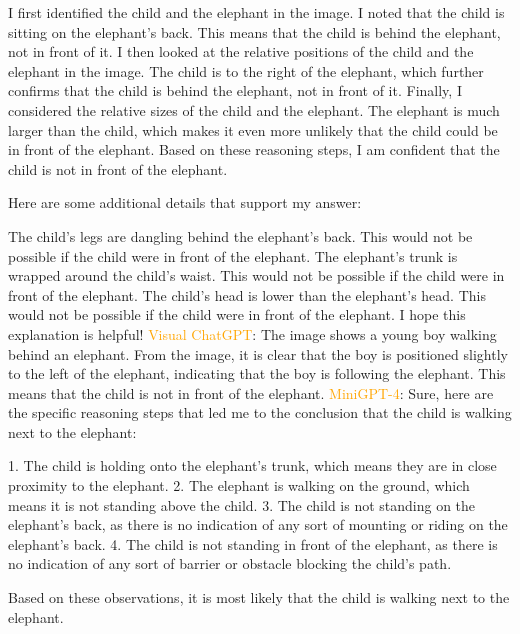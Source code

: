 \begin{enumerate}
        I first identified the child and the elephant in the image.
        I noted that the child is sitting on the elephant's back. This means that the child is behind the elephant, not in front of it.
        I then looked at the relative positions of the child and the elephant in the image. The child is to the right of the elephant, which further confirms that the child is behind the elephant, not in front of it.
        Finally, I considered the relative sizes of the child and the elephant. The elephant is much larger than the child, which makes it even more unlikely that the child could be in front of the elephant.
        Based on these reasoning steps, I am confident that the child is not in front of the elephant.

        Here are some additional details that support my answer:

        The child's legs are dangling behind the elephant's back. This would not be possible if the child were in front of the elephant.
        The elephant's trunk is wrapped around the child's waist. This would not be possible if the child were in front of the elephant.
        The child's head is lower than the elephant's head. This would not be possible if the child were in front of the elephant.
        I hope this explanation is helpful!
        \subitem \textcolor{orange}{Visual ChatGPT}: The image shows a young boy walking behind an elephant. From the image, it is clear that the boy is positioned slightly to the left of the elephant, indicating that the boy is following the elephant. This means that the child is not in front of the elephant.
        \subitem \textcolor{orange}{MiniGPT-4}: Sure, here are the specific reasoning steps that led me to the conclusion that the child is walking next to the elephant:

        1. The child is holding onto the elephant’s trunk, which means they are in close proximity to the elephant.
        2. The elephant is walking on the ground, which means it is not standing above the child.
        3. The child is not standing on the elephant’s back, as there is no indication of any sort of mounting or riding on the elephant’s back.
        4. The child is not standing in front of the elephant, as there is no indication of any sort of barrier or obstacle blocking the child’s path.
        
        Based on these observations, it is most likely that the child is walking next to the elephant.
    \end{enumerate}
